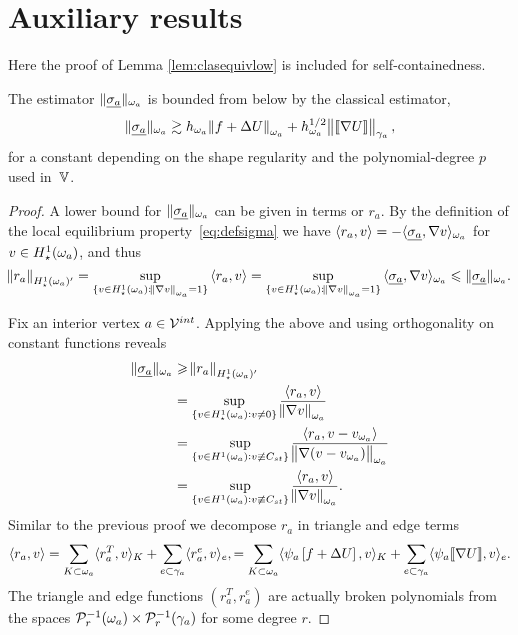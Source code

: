 \documentclass[thesis.tex]{subfiles}
\begin{document}
\section{Auxiliary results}
\label{sec:aux}
Here the proof of Lemma \ref{lem:clasequivlow} is included for self-containedness.
  \begin{lemstar}
  The estimator $\| \underline{\sigma_a} \|_{\omega_a}$ is bounded from below by the classical estimator,
  \[
    \| \underline{\sigma_a} \|_{\omega_a} \gtrsim h_{\omega_a}\norm{f + \Delta U}_{\omega_a} + h^{1/2}_{\omega_a} \norm{\llbracket \nabla U  \rrbracket}_{\gamma_a},
  \]
  for a constant depending on the shape regularity and the polynomial-degree $p$ used in~$\mathbb{V}$.
  \end{lemstar}
\begin{proof}
  A lower bound for $\| \underline{\sigma_a} \|_{\omega_a}$ can be given in terms or $r_a$.
  By the definition of the local equilibrium property~\eqref{eq:defsigma} we have $\langle r_a, v \rangle = - \langle \underline{\sigma_a}, \nabla v \rangle_{\omega_a}$ for $v \in H_\star^1(\omega_a)$,
  and thus
  \[
    \norm{r_a}_{H_\star^1(\omega_a)'} = \sup_{\{v \in H_\star^1(\omega_a) : \norm{\nabla v}_{\omega_a} = 1\}} {\langle r_a, v \rangle} = \sup_{\{v \in H_\star^1(\omega_a) : \norm{\nabla v}_{\omega_a}=1\}} {\langle \underline{\sigma_a}, \nabla v \rangle_{\omega_a}} \leqslant \| \underline{\sigma_a} \|_{\omega_a}.
  \]

  Fix an interior vertex  $a \in \mathcal{V}^{int}$. Applying the above and using orthogonality on constant functions reveals  
  \begin{align*}
    \| \underline{\sigma_a} \|_{\omega_a} &\geqslant \norm{r_a}_{H^1_\star(\omega_a)'} \\
    &= \sup_{\{v \in H^1_\star(\omega_a) : v \ne 0\}} { \langle r_a, v \rangle \over \norm{\nabla v}_{\omega_a}} \\
    &= \sup_{\{v \in H^1(\omega_a) : v \not \equiv C_{st}\}} { \langle r_a, v - v_{\omega_a} \rangle \over \norm{\nabla (v - v_{\omega_a})}_{\omega_a}} \\
    &= \sup_{\{v \in H^1(\omega_a) : v \not \equiv C_{st}\}} { \langle r_a, v \rangle \over \norm{\nabla v}_{\omega_a}}.
  \end{align*}
  Similar to the previous proof we decompose $r_a$ in triangle and edge terms
  \[
    \langle r_a,v \rangle = \sum_{K\subset \omega_a} \langle{r^T_a, v}\rangle_K + \sum_{e \subset \gamma_a} \langle r^e_a, v \rangle_e,
    = \sum_{K\subset \omega_a} \langle{\psi_a \left [f+\Delta U \right], v}\rangle_K + \sum_{e \subset \gamma_a} \langle \psi_a \llbracket \nabla U \rrbracket, v \rangle_e.
  \]
  The triangle and edge functions $(r^T_a, r^e_a)$ are actually broken polynomials from the spaces $\mathcal{P}_r^{-1}(\omega_a)\times \mathcal{P}_r^{-1}(\gamma_a)$ for some degree $r$.


\end{proof}
\end{document}
